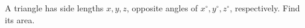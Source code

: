 A triangle has side lengths $x,y,z$, opposite angles of $x^\circ,y^\circ,z^\circ$, respectively. Find its area.
